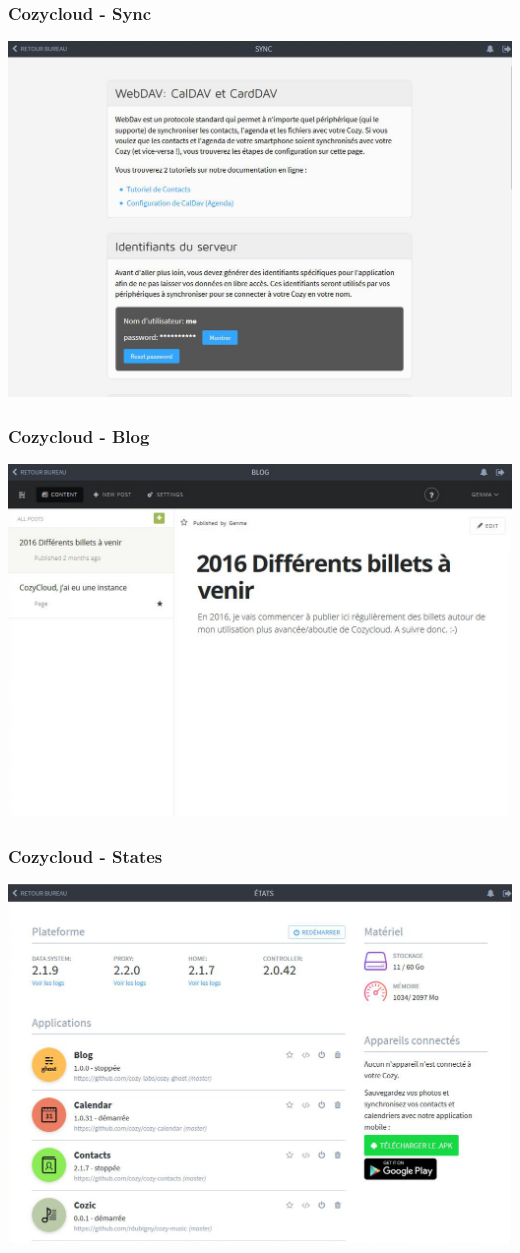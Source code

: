 \documentclass{beamer}
\begin{document}
\begin{frame}
\frametitle{Cozycloud - Sync}
\includegraphics[scale=0.3] {./CozyCloud/CozyCloud_Sync.jpg}
\end{frame}

\begin{frame}
\frametitle{Cozycloud - Blog}
\includegraphics[scale=0.3] {./CozyCloud/CozyCloud_Blog.jpg}
\end{frame}

\begin{frame}
\frametitle{Cozycloud - States}
\includegraphics[scale=0.3] {./CozyCloud/CozyCloud_Etats.jpg}
\end{frame}
\end{document}
